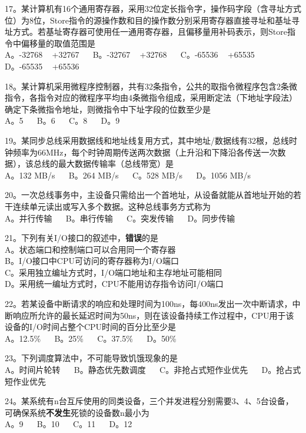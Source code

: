 17。某计算机有16个通用寄存器，采用32位定长指令字，操作码字段（含寻址方式位）为8位，Store指令的源操作数和目的操作数分别采用寄存器直接寻址和基址寻址方式。若基址寄存器可使用任一通用寄存器，且偏移量用补码表示，则Store指令中偏移量的取值范围是 \\
A。-32768 ~ +32767 $\quad$ B。-32767 ~ +32768 $\quad$ C。-65536 ~ +65535 $\quad$ D。-65535 ~ +65536

18。某计算机采用微程序控制器，共有32条指令，公共的取指令微程序包含2条微指令，各指令对应的微程序平均由4条微指令组成，采用断定法（下地址字段法）确定下条微指令地址，则微指令中下址字段的位数至少是 \\
A。5 $\quad$ B。6 $\quad$ C。8 $\quad$ D。9

19。某同步总线采用数据线和地址线复用方式，其中地址/数据线有32根，总线时钟频率为66MHz，每个时钟周期传送两次数据（上升沿和下降沿各传送一次数据），该总线的最大数据传输率（总线带宽）是 \\
A。132 MB/s $\quad$ B。264 MB/s $\quad$ C。528 MB/s $\quad$ D。1056 MB/s

20。一次总线事务中，主设备只需给出一个首地址，从设备就能从首地址开始的若干连续单元读出或写入多个数据。这种总线事务方式称为 \\
A。并行传输 $\quad$ B。串行传输 $\quad$ C。突发传输 $\quad$ D。同步传输

21。下列有关I/O接口的叙述中，\textbf{错误}的是 \\
A。状态端口和控制端口可以合用同一个寄存器 \\
B。I/O接口中CPU可访问的寄存器称为I/O端口 \\
C。采用独立编址方式时，I/O端口地址和主存地址可能相同 \\
D。采用统一编址方式时，CPU不能用访存指令访问I/O端口

22。若某设备中断请求的响应和处理时间为100ns，每400ns发出一次中断请求，中断响应所允许的最长延迟时间为50ns，则在该设备持续工作过程中，CPU用于该设备的I/O时间占整个CPU时间的百分比至少是 \\
A。12.5\% $\quad$ B。25\% $\quad$ C。37.5\% $\quad$ D。50\%

23。下列调度算法中，不可能导致饥饿现象的是 \\
A。时间片轮转 $\quad$ B。静态优先数调度 $\quad$ C。非抢占式短作业优先 $\quad$ D。抢占式短作业优先

24。某系统有n台互斥使用的同类设备，三个并发进程分别需要3、4、5台设备，可确保系统\textbf{不发生}死锁的设备数n最小为 \\
A。9 $\quad$ B。10 $\quad$ C。11 $\quad$ D。12

